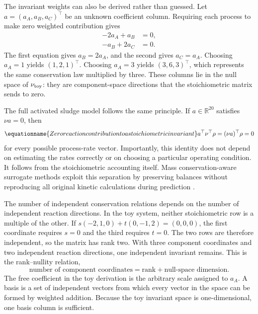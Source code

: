 The invariant weights can also be derived rather than guessed. Let
$a=(a_A,a_B,a_C)^\top$ be an unknown coefficient column. Requiring each process to make zero weighted contribution gives
\[
\begin{aligned}
-2a_A+a_B&=0,\\
-a_B+2a_C&=0.
\end{aligned}
\]
The first equation gives $a_B=2a_A$, and the second gives $a_C=a_A$. Choosing $a_A=1$ yields $(1,2,1)^\top$. Choosing $a_A=3$ yields $(3,6,3)^\top$, which represents the same conservation law multiplied by three. These columns lie in the null space of $\nu_{\rm toy}$: they are component-space directions that the stoichiometric matrix sends to zero.

The full activated sludge model follows the same principle. If $a\in\mathbb{R}^{20}$ satisfies $\nu a=0$, then
\begin{equation}
\equationname{Zero reaction contribution to a stoichiometric invariant}
a^\top\nu^\top\rho=(\nu a)^\top\rho=0
\label{eq:individual_invariant}
\end{equation}
for every possible process-rate vector. Importantly, this identity does not depend on estimating the rates correctly or on choosing a particular operating condition. It follows from the stoichiometric accounting itself. Mass conservation-aware surrogate methods exploit this separation by preserving balances without reproducing all original kinetic calculations during prediction \citep{SturmWexler2020,SturmWexler2022,Hansen2024}.

The number of independent conservation relations depends on the number of independent reaction directions. In the toy system, neither stoichiometric row is a multiple of the other. If
$s(-2,1,0)+t(0,-1,2)=(0,0,0)$, the first coordinate requires $s=0$ and the third requires $t=0$. The two rows are therefore independent, so the matrix has rank two. With three component coordinates and two independent reaction directions, one independent invariant remains. This is the rank--nullity relation,
\[
\text{number of component coordinates}
=\text{rank}+\text{null-space dimension}.
\]
The free coefficient in the toy derivation is the arbitrary scale assigned to $a_A$. A basis is a set of independent vectors from which every vector in the space can be formed by weighted addition. Because the toy invariant space is one-dimensional, one basis column is sufficient.

